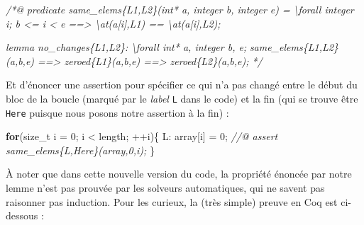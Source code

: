 \documentclass[12pt,francais,]{scrbook}
\newenvironment{Shaded}{}{}
\newcommand{\KeywordTok}[1]{\textcolor[rgb]{0.00,0.44,0.13}{\textbf{{#1}}}}
\newcommand{\DecValTok}[1]{\textcolor[rgb]{0.25,0.63,0.44}{{#1}}}
\newcommand{\CommentTok}[1]{\textcolor[rgb]{0.38,0.63,0.69}{\textit{{#1}}}}
\newcommand{\NormalTok}[1]{{#1}}
\begin{document}
\begin{footnotesize}\begin{Shaded}
\begin{Highlighting}[]
\CommentTok{/*@}
\CommentTok{  predicate same_elems\{L1,L2\}(int* a, integer b, integer e) =}
\CommentTok{    \textbackslash{}forall integer i; b <= i < e ==> \textbackslash{}at(a[i],L1) == \textbackslash{}at(a[i],L2);}

\CommentTok{  lemma no_changes\{L1,L2\}:}
\CommentTok{  \textbackslash{}forall int* a, integer b, e;}
\CommentTok{  same_elems\{L1,L2\}(a,b,e) ==> zeroed\{L1\}(a,b,e) ==> zeroed\{L2\}(a,b,e);}
\CommentTok{*/}
\end{Highlighting}
\end{Shaded}\end{footnotesize}

Et d'énoncer une assertion pour spécifier ce qui n'a pas changé entre le
début du bloc de la boucle (marqué par le \emph{label} \texttt{L} dans
le code) et la fin (qui se trouve être \texttt{Here} puisque nous posons
notre assertion à la fin) :

\begin{footnotesize}\begin{Shaded}
\begin{Highlighting}[]
\KeywordTok{for}\NormalTok{(size_t i = }\DecValTok{0}\NormalTok{; i < length; ++i)\{}
  \NormalTok{L:}
  \NormalTok{array[i] = }\DecValTok{0}\NormalTok{;}
  \CommentTok{//@ assert same_elems\{L,Here\}(array,0,i);}
\NormalTok{\}}
\end{Highlighting}
\end{Shaded}\end{footnotesize}

À noter que dans cette nouvelle version du code, la propriété énoncée
par notre lemme n'est pas prouvée par les solveurs automatiques, qui ne
savent pas raisonner pas induction. Pour les curieux, la (très simple)
preuve en Coq est ci-dessous :
\end{document}

